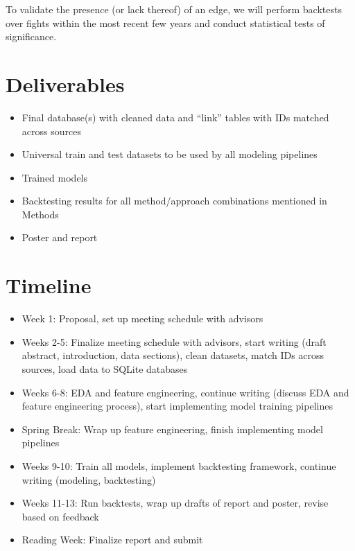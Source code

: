 \documentclass[
  letterpaper,
  DIV=11,
  numbers=noendperiod]{scrartcl}
\providecommand{\tightlist}{%
  \setlength{\itemsep}{0pt}\setlength{\parskip}{0pt}}\usepackage{longtable,booktabs,array}
\begin{document}
To validate the presence (or lack thereof) of an edge, we will perform backtests over fights within the most recent few years and conduct statistical tests of significance.


\section{Deliverables}\label{deliverables}

\begin{itemize}
\tightlist
    \item Final database(s) with cleaned data and ``link'' tables with IDs matched across sources
    \item Universal train and test datasets to be used by all modeling pipelines
    \item Trained models
    \item Backtesting results for all method/approach combinations mentioned in Methods
    \item Poster and report
\end{itemize}


\section{Timeline}\label{timeline}

\begin{itemize}
\tightlist
    \item Week 1: Proposal, set up meeting schedule with advisors
    \item Weeks 2-5: Finalize meeting schedule with advisors, start writing (draft abstract, introduction, data sections), clean datasets, match IDs across sources, load data to SQLite databases
    \item Weeks 6-8: EDA and feature engineering, continue writing (discuss EDA and feature engineering process), start implementing model training pipelines
    \item Spring Break: Wrap up feature engineering, finish implementing model pipelines
    \item Weeks 9-10: Train all models, implement backtesting framework, continue writing (modeling, backtesting)
    \item Weeks 11-13: Run backtests, wrap up drafts of report and poster, revise based on feedback
    \item Reading Week: Finalize report and submit
\end{itemize}
\end{document}
